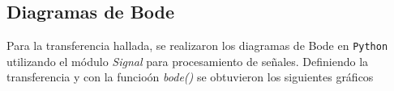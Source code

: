 \subsection*{Diagramas de Bode}
Para la transferencia hallada, se realizaron los diagramas de Bode en \texttt{Python} utilizando el m\'odulo \textit{Signal} para procesamiento de señales. Definiendo la transferencia y con la funcio\'on \textit{bode()} se obtuvieron los siguientes gr\'aficos\\
\begin{figure}[h]
\begin{center}

\hfill
{}

\end{center}
\end{figure}



